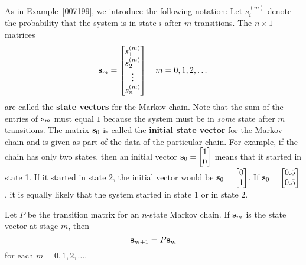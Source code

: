 \documentclass{ximera}
\begin{document}
As in Example~\ref{007199}, we introduce the following notation: Let $s_{i}^{(m)}$ denote the probability that the system is in state $i$ after $m$ transitions. The $n \times 1$ matrices
\begin{equation*}
{\bf s}_m = \begin{bmatrix}
s_{1}^{(m)} \\
s_{2}^{(m)} \\
\vdots \\
s_{n}^{(m)}
\end{bmatrix}
\quad m = 0, 1, 2, \dots
\end{equation*}
are called the \textbf{state vectors} for the Markov chain. Note that the sum of the entries of ${\bf s}_{m}$ must equal $1$ because the system must be in \textit{some} state after $m$ transitions. The matrix ${\bf s}_{0}$ is called the \textbf{initial state vector} for the Markov chain and is given as part of the data of the particular chain. For example, if the chain has only two states, then an initial vector ${\bf s}_0 = \begin{bmatrix}
1 \\
0
\end{bmatrix}$
 means that it started in state 1. If it started in state 2, the initial vector would be ${\bf s}_0 = \begin{bmatrix}
0 \\
1
\end{bmatrix}$.
 If ${\bf s}_0 = \begin{bmatrix}
0.5 \\
0.5
\end{bmatrix}$, it is equally likely that the system started in state 1 or in state 2.

\begin{theorem}\label{007270}
Let $P$ be the transition matrix for an $n$-state Markov chain. If ${\bf s}_{m}$ is the state vector at stage $m$, then
\begin{equation*}
{\bf s}_{m+1} = P{\bf s}_m
\end{equation*}
for each $m = 0, 1, 2, \dots$.
\end{theorem}
\end{document}
